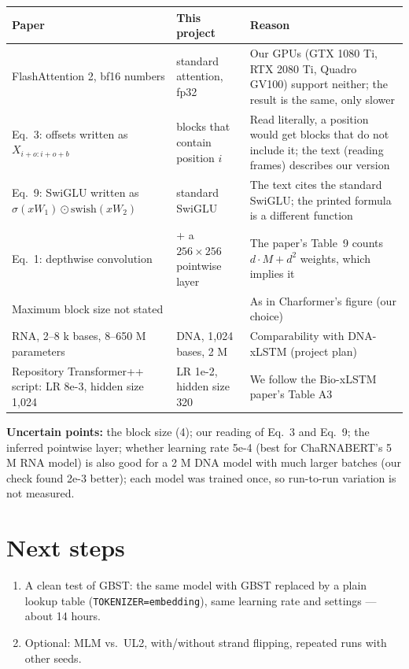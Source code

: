 \documentclass[11pt,a4paper]{article}
\newcommand{\code}[1]{\texttt{\small #1}}
\begin{document}
\begin{center}\small
\begin{tabularx}{\linewidth}{>{\raggedright\arraybackslash}p{4.3cm}>{\raggedright\arraybackslash}p{3.4cm}L}
\toprule
Paper & This project & Reason \\
\midrule
FlashAttention 2, bf16 numbers & standard attention, fp32 & Our GPUs (GTX 1080 Ti, RTX 2080 Ti, Quadro GV100) support neither; the result is the same, only slower \\
Eq.~3: offsets written as $X_{i+o:i+o+b}$ & blocks that contain position $i$ & Read literally, a position would get blocks that do not include it; the text (reading frames) describes our version \\
Eq.~9: SwiGLU written as $\sigma(xW_1)\odot\text{swish}(xW_2)$ & standard SwiGLU & The text cites the standard SwiGLU; the printed formula is a different function \\
Eq.~1: depthwise convolution & + a $256\times256$ pointwise layer & The paper's Table~9 counts $d\cdot M + d^2$ weights, which implies it \\
Maximum block size not stated & 4 & As in Charformer's figure (our choice) \\
RNA, 2--8 k bases, 8--650 M parameters & DNA, 1,024 bases, 2 M & Comparability with DNA-xLSTM (project plan) \\
Repository Transformer++ script: LR 8e-3, hidden size 1,024 & LR 1e-2, hidden size 320 & We follow the Bio-xLSTM paper's Table A3 \\
\bottomrule
\end{tabularx}
\end{center}

\textbf{Uncertain points:} the block size (4); our reading of Eq.~3 and Eq.~9; the inferred
pointwise layer; whether learning rate 5e-4 (best for ChaRNABERT's 5 M RNA model) is also good for
a 2 M DNA model with much larger batches (our check found 2e-3 better); each model was trained
once, so run-to-run variation is not measured.

\section{Next steps}
\begin{enumerate}
\item A clean test of GBST: the same model with GBST replaced by a plain lookup table
  (\code{TOKENIZER=embedding}), same learning rate and settings --- about 14 hours.
\item Optional: MLM vs.\ UL2, with/without strand flipping, repeated runs with other seeds.
\end{enumerate}
\end{document}
